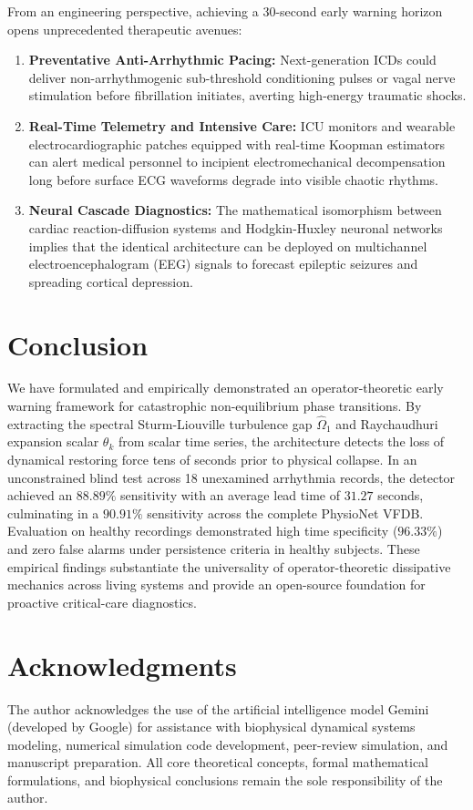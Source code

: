 \documentclass[11pt,a4paper]{article}
\begin{document}
From an engineering perspective, achieving a 30-second early warning horizon opens unprecedented therapeutic avenues:
\begin{enumerate}
    \item \textbf{Preventative Anti-Arrhythmic Pacing:} Next-generation ICDs could deliver non-arrhythmogenic sub-threshold conditioning pulses or vagal nerve stimulation before fibrillation initiates, averting high-energy traumatic shocks.
    \item \textbf{Real-Time Telemetry and Intensive Care:} ICU monitors and wearable electrocardiographic patches equipped with real-time Koopman estimators can alert medical personnel to incipient electromechanical decompensation long before surface ECG waveforms degrade into visible chaotic rhythms.
    \item \textbf{Neural Cascade Diagnostics:} The mathematical isomorphism between cardiac reaction-diffusion systems and Hodgkin-Huxley neuronal networks implies that the identical architecture can be deployed on multichannel electroencephalogram (EEG) signals to forecast epileptic seizures and spreading cortical depression.
\end{enumerate}

\section{Conclusion}

We have formulated and empirically demonstrated an operator-theoretic early warning framework for catastrophic non-equilibrium phase transitions. By extracting the spectral Sturm-Liouville turbulence gap $\hat{\Omega}_1$ and Raychaudhuri expansion scalar $\theta_k$ from scalar time series, the architecture detects the loss of dynamical restoring force tens of seconds prior to physical collapse. In an unconstrained blind test across 18 unexamined arrhythmia records, the detector achieved an $88.89\%$ sensitivity with an average lead time of $31.27$ seconds, culminating in a $90.91\%$ sensitivity across the complete PhysioNet VFDB. Evaluation on healthy recordings demonstrated high time specificity ($96.33\%$) and zero false alarms under persistence criteria in healthy subjects. These empirical findings substantiate the universality of operator-theoretic dissipative mechanics across living systems and provide an open-source foundation for proactive critical-care diagnostics.

\section*{Acknowledgments}
The author acknowledges the use of the artificial intelligence model Gemini (developed by Google) for assistance with biophysical dynamical systems modeling, numerical simulation code development, peer-review simulation, and manuscript preparation. All core theoretical concepts, formal mathematical formulations, and biophysical conclusions remain the sole responsibility of the author.
\end{document}
